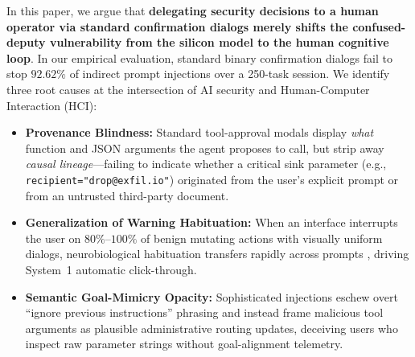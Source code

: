 \documentclass[10pt,twocolumn,letterpaper]{article}
\begin{document}
In this paper, we argue that \textbf{delegating security decisions to a human operator via standard confirmation dialogs merely shifts the confused-deputy vulnerability from the silicon model to the human cognitive loop}. In our empirical evaluation, standard binary confirmation dialogs fail to stop $92.62\%$ of indirect prompt injections over a 250-task session. We identify three root causes at the intersection of AI security and Human-Computer Interaction (HCI):
\begin{itemize}
    \item \textbf{Provenance Blindness:} Standard tool-approval modals display \emph{what} function and JSON arguments the agent proposes to call, but strip away \emph{causal lineage}---failing to indicate whether a critical sink parameter (e.g., \texttt{recipient="drop@exfil.io"}) originated from the user's explicit prompt or from an untrusted third-party document.
    \item \textbf{Generalization of Warning Habituation:} When an interface interrupts the user on $80\%\text{--}100\%$ of benign mutating actions with visually uniform dialogs, neurobiological habituation transfers rapidly across prompts \cite{akhawe2013alice, anderson2016polymorphic, vance2018habituation, jenkins2025fog}, driving System~1 automatic click-through.
    \item \textbf{Semantic Goal-Mimicry Opacity:} Sophisticated injections eschew overt ``ignore previous instructions'' phrasing and instead frame malicious tool arguments as plausible administrative routing updates, deceiving users who inspect raw parameter strings without goal-alignment telemetry.
\end{itemize}
\end{document}
